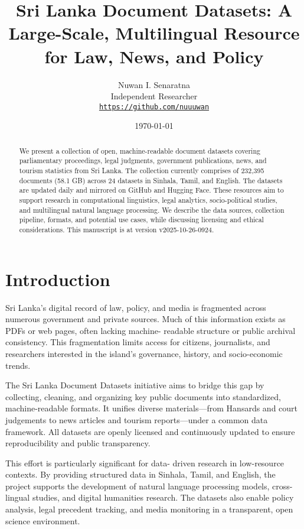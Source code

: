 \documentclass[10pt,a4paper]{article}%
\title{Sri Lanka Document Datasets: A Large{-}Scale, Multilingual Resource for Law, News, and Policy}%
\author{Nuwan I. Senaratna\\Independent Researcher\\\vspace{0.25em}\texttt{\href{https://github.com/nuuuwan}{https://github.com/nuuuwan}}}%
\date{\today}%
\begin{document}
%
\normalsize%
\maketitle%
\begin{abstract}%
We present a collection of open, machine-readable document datasets covering parliamentary proceedings, legal judgments, government publications, news, and tourism statistics from Sri Lanka. The collection currently comprises of  232,395  documents (58.1 GB) across 24  datasets in Sinhala, Tamil, and English. The datasets are updated daily and mirrored on GitHub and Hugging Face. These resources aim to support research in computational linguistics, legal analytics, socio-political studies, and multilingual natural language processing. We describe the data sources, collection pipeline, formats, and potential use cases, while discussing licensing and ethical considerations. This manuscript is at version v2025-10-26-0924.%

%
\end{abstract}%
\section{Introduction}%
\label{sec:Introduction}%
Sri Lanka’s digital record of law, policy, and media is fragmented across numerous government and private sources. Much of this information exists as PDFs or web pages, often lacking machine- readable structure or public archival consistency. This fragmentation limits access for citizens, journalists, and researchers interested in the island’s governance, history, and socio-economic trends.%

%
The Sri Lanka Document Datasets initiative aims to bridge this gap by collecting, cleaning, and organizing key public documents into standardized, machine-readable formats. It unifies diverse materials—from Hansards and court judgements to news articles and tourism reports—under a common data framework. All datasets are openly licensed and continuously updated to ensure reproducibility and public transparency.%

%
This effort is particularly significant for data- driven research in low-resource contexts. By providing structured data in Sinhala, Tamil, and English, the project supports the development of natural language processing models, cross-lingual studies, and digital humanities research. The datasets also enable policy analysis, legal precedent tracking, and media monitoring in a transparent, open science environment.%
\end{document}
